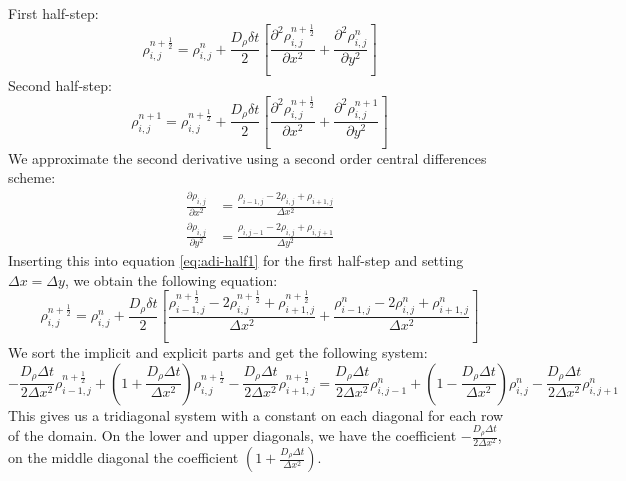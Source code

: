 \documentclass[a4paper]{article}
\begin{document}
First half-step:
\begin{equation}
	\rho_{i,j}^{n+\frac{1}{2}} = \rho_{i,j}^n + \frac{D_\rho \delta t}{2} \left[ \frac{\partial^2 \rho_{i,j}^{n+\frac{1}{2}}}{\partial x^2} + \frac{\partial^2 \rho_{i,j}^n}{\partial y^2} \right]
	\label{eq:adi-half1}
\end{equation}
Second half-step:
\begin{equation}
	\rho_{i,j}^{n+1} = \rho_{i,j}^{n+\frac{1}{2}} + \frac{D_\rho \delta t}{2} \left[ \frac{\partial^2 \rho_{i,j}^{n+\frac{1}{2}}}{\partial x^2} + \frac{\partial^2 \rho_{i,j}^{n+1}}{\partial y^2} \right]
	\label{eq:adi-half2}
\end{equation}
We approximate the second derivative using a second order central differences scheme:
\begin{align}
	\frac{\partial \rho_{i,j}}{\partial x^2} &= \frac{\rho_{i-1,j} - 2 \rho_{i,j} + \rho_{i+1,j}}{\Delta x^2} \\
	\frac{\partial \rho_{i,j}}{\partial y^2} &= \frac{\rho_{i,j-1} - 2 \rho_{i,j} + \rho_{i,j+1}}{\Delta y^2}
\end{align}
Inserting this into equation \ref{eq:adi-half1} for the first half-step and setting $\Delta x = \Delta y$, we obtain the following equation:
\begin{equation}
	\rho_{i,j}^{n+\frac{1}{2}} = \rho_{i,j}^n + \frac{D_\rho \delta t}{2} \left[ \frac{\rho_{i-1,j}^{n+\frac{1}{2}} - 2 \rho_{i,j}^{n+\frac{1}{2}} + \rho_{i+1,j}^{n+\frac{1}{2}}}{\Delta x^2} + \frac{\rho_{i-1,j}^n - 2 \rho_{i,j}^n + \rho_{i+1,j}^n}{\Delta x^2} \right]
\end{equation}
We sort the implicit and explicit parts and get the following system:
\begin{equation}
	-\frac{D_\rho \Delta t}{2 \Delta x^2} \rho_{i-1,j}^{n + \frac{1}{2}} + \left( 1 + \frac{D_\rho \Delta t}{\Delta x^2} \right) \rho_{i,j}^{n + \frac{1}{2}} - \frac{D_\rho \Delta t}{2 \Delta x^2} \rho_{i+1,j}^{n + \frac{1}{2}} 
	= \frac{D_\rho \Delta t}{2 \Delta x^2} \rho_{i,j-1}^n + \left( 1 - \frac{D_\rho \Delta t}{\Delta x^2} \right) \rho_{i,j}^n - \frac{D_\rho \Delta t}{2 \Delta x^2} \rho_{i,j+1}^n
\end{equation}
This gives us a tridiagonal system with a constant on each diagonal for each row of the domain.
On the lower and upper diagonals, we have the coefficient $-\frac{D_\rho \Delta t}{2 \Delta x^2}$, on the middle diagonal the coefficient $\left( 1 + \frac{D_\rho \Delta t}{\Delta x^2} \right)$.
\end{document}
